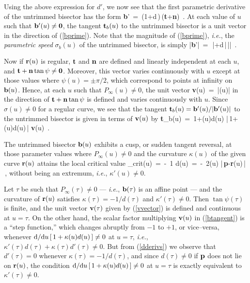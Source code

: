Using the above expression for $d'$, we now see that the first parametric
derivative of the untrimmed bisector has the form
\be \label{bprime}
{\bf b}' \,=\, \sigma(1+\kappa d\,)\,({\bf t}+{\bf n}\tan\psi) \,.
\ee
At each value of $u$ such that ${\bf b}'(u)\not={\bf 0}$, the tangent
${\bf t}_b(u)$ to the untrimmed bisector is a unit vector in the direction
of (\ref{bprime}). Note that the magnitude of (\ref{bprime}), {\it i.e.},
the {\it parametric speed\/} $\sigma_b(u)$ of the untrimmed bisector, is
simply
\be \label{magbprime}
|{\bf b}'| \,=\, \sigma\,|\;+\kappa d\,|\,|\sec\psi\;\!| \,.
\ee

Now if ${\bf r}(u)$ is regular,
${\bf t}$
and
${\bf n}$
are defined and linearly independent at each $u$,
and ${\bf t}+{\bf n}\tan\psi\not={\bf 0}$. Moreover,
this vector varies continuously with $u$ except at those values
where $\psi(u)=\pm\pi/2$, which correspond to
points at infinity on ${\bf b}(u)$. Hence,
at each $u$ such that $P_\infty(u)\not=0$, the unit vector
\be \label{vvector}
{\bf v}(u) \,=\, |\cos\psi(u)\;\!| 
\ee
in the direction of ${\bf t}+{\bf n}\tan\psi$ is defined and
varies continuously with $u$. Since $\sigma(u)\not=0$ for
a regular curve, we see that the tangent ${\bf t}_b(u)={\bf b}'(u) /
|{\bf b}'(u)|$ to the untrimmed bisector is given in terms of ${\bf v}
(u)$ by
\be \label{btangent}
{\bf t}_b(u) \,=\,
{1+\kappa(u)d(u) \over |\,1+\kappa(u)d(u)\,|} \; {\bf v}(u) \,.
\ee

\begin{lma}
The untrimmed bisector ${\bf b}(u)$ exhibits a {\rm cusp}, or sudden
tangent reversal, at those parameter values where $P_\infty(u)\not=0$
and the curvature $\kappa(u)$ of the given curve ${\bf r}(u)$ attains
the local critical value
\be \label{kappacrit}
\kappa_{\rm crit}(u) \,=\, -\ {1 \over d(u)} \,=\,
-\ {2\cos\psi(u) \over |\,{\bf p}-{\bf r}(u)\,|} \,,
\ee
without being an extremum, {\it i.e.}, $\kappa'(u)\not=0$.
\end{lma}

\prf Let $\tau$ be such that $P_\infty(\tau)\not
=0$ --- {\it i.e.}, ${\bf b}(\tau)$ is an affine point ---
and the curvature of ${\bf r}(u)$ satisfies
$\kappa(\tau)=-1/d(\tau)$ and $\kappa'(\tau)\not=0$. Then $\tan
\psi(\tau)$ is finite, and the unit vector ${\bf v}(\tau)$ given by
(\ref{vvector}) is defined and continuous at $u=\tau$. On the other
hand, the scalar factor multiplying ${\bf v}(u)$ in (\ref{btangent})
is a ``step function,'' which changes abruptly from $-1$ to $+1$,
or vice--versa,
whenever ${\rm d}/{\rm d} u\,[\,1+\kappa(u)d(u)\,]
\not=0$ at $u=\tau$, {\it i.e.}, $\kappa'(\tau)d(\tau)+\kappa(\tau)
d'(\tau)\not=0$. But from (\ref{dderivs}) we observe that $d'(\tau)
=0$ whenever $\kappa(\tau)=-1/d(\tau)$, and since $d(\tau)\not=0$
if ${\bf p}$ does not lie on ${\bf r}(u)$, the
condition ${\rm d}/{\rm d} u\,[\,1+\kappa(u)d(u)\,]\not=0$ at $u=\tau$ is
exactly equivalent to $\kappa'(\tau)\not=0$. \QED

